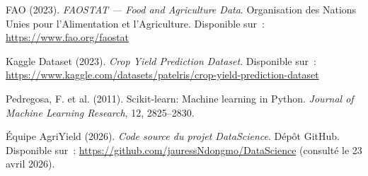 \begin{enumerate}[label={[\arabic*]}, leftmargin=1.5cm, itemsep=5pt]
  \item FAO (2023). \textit{FAOSTAT --- Food and Agriculture Data}. Organisation des Nations Unies pour l'Alimentation et l'Agriculture. Disponible sur~: \url{https://www.fao.org/faostat}

  \item Kaggle Dataset (2023). \textit{Crop Yield Prediction Dataset}. Disponible sur~: \url{https://www.kaggle.com/datasets/patelris/crop-yield-prediction-dataset}

  \item Pedregosa, F. et al. (2011). Scikit-learn: Machine learning in Python. \textit{Journal of Machine Learning Research}, 12, 2825--2830.

  \item Équipe AgriYield (2026). \textit{Code source du projet DataScience}. Dépôt GitHub. Disponible sur~: \url{https://github.com/jauressNdongmo/DataScience} (consulté le 23 avril 2026).

\end{enumerate}
